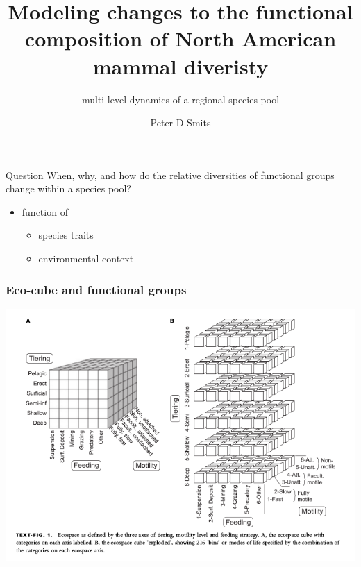 \documentclass{beamer}
\title{Modeling changes to the functional composition of North American mammal diveristy}
\subtitle{multi-level dynamics of a regional species pool}
\author{Peter D Smits}
\institute{Department of Integrative Biology, University of California -- Berkeley}
\date{}
\begin{document}
\begin{frame}
  \maketitle
\end{frame}


\begin{frame}
  \begin{alertblock}{Question}
    \alert{When}, \alert{why}, and \alert{how} do the relative diversities of functional groups change within a species pool?
    \begin{itemize}
      \item function of
        \begin{itemize}
          \item species traits
          \item environmental context
        \end{itemize}
    \end{itemize}
  \end{alertblock}
\end{frame}


\begin{frame}
  \frametitle{Eco-cube and functional groups}

  \begin{center}
    \includegraphics[height=0.8\textheight,width=\textwidth,keepaspectratio=true]{figure/ecocube}
  \end{center}

\end{frame}
\end{document}
